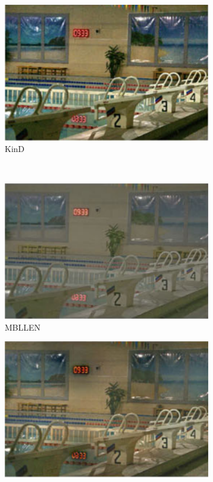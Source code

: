 \documentclass[a4paper]{ctexart}
\begin{document}
\begin{figure}[htb]
\begin{subfigure}{0.19\textwidth}
			\includegraphics[width=\linewidth]{picture/LLIE/Efficent/KinD}
			\captionsetup{font=scriptsize}
			\caption{KinD}
			\label{fig: KinD}	
		\end{subfigure}\\
		\begin{subfigure}{0.19\textwidth}
			\includegraphics[width=\linewidth]{picture/LLIE/Efficent/MBLLEN}
			\captionsetup{font=scriptsize}
			\caption{MBLLEN}
			\label{fig: MBLLEN}	
		\end{subfigure}
		\begin{subfigure}{0.19\textwidth}
			\includegraphics[width=\linewidth]{picture/LLIE/Efficent/EnlightenGAN}

\end{subfigure}
\end{figure}
\end{document}
